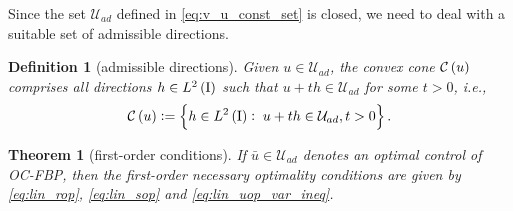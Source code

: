 \documentclass[final]{siamltex}
\newtheorem{thm}[theorem]{Theorem}
\newtheorem{defn}[theorem]{Definition}
\begin{document}
Since the set ${{\mathcal{U}_{ad}}}$ defined in
\eqref{eq:v_u_const_set} is closed, we need to deal with a suitable 
set of admissible directions.
\begin{defn}[admissible directions] \label{def:u_convex_cone}
Given $u \in {{\mathcal{U}_{ad}}}$, the convex cone ${{\mathcal C\del{{u}}}}$ comprises all directions 
$h \in {{L^2\del{{\text{\rm I}}}}}$ such that $u+th \in {{\mathcal{U}_{ad}}}$ for some $t>0$, i.e.,
	\[
    	{{\mathcal C\del{{u}}}} := \set{h \in {{L^2\del{{\text{\rm I}}}}}:\; u+th \in \mathcal
          U_{ad}, t>0}.
	\]    
\end{defn}
\begin{thm}[first-order conditions] \label{thm:oc_rc_first}
If ${\bar{u}} \in {{\mathcal{U}_{ad}}}$ denotes an optimal control of OC-FBP, then the first-order necessary optimality conditions are 
given by \eqref{eq:lin_rop}, \eqref{eq:lin_sop} and \eqref{eq:lin_uop_var_ineq}. 
\end{thm}
\end{document}
